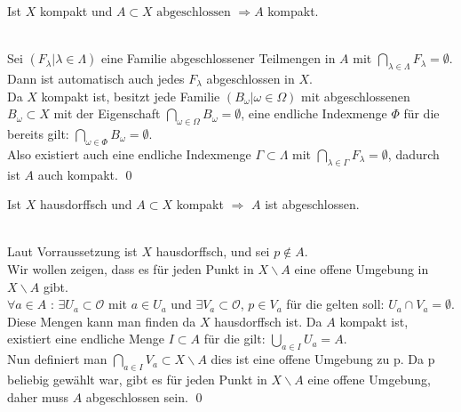 \begin{Satz}
		Ist \(X\) kompakt und \(A \subset X \mbox{ abgeschlossen } \Rightarrow A\) kompakt.
\end{Satz}
%
	\\
 	Sei \((F_{\lambda} | \lambda \in \Lambda) \) eine Familie abgeschlossener Teilmengen in \(A\) mit \( \bigcap_{\lambda \in \Lambda } F_{\lambda} = \emptyset \).\\
	Dann ist automatisch auch jedes \(F_{\lambda} \) abgeschlossen in \(X\).\\
	Da \(X\) kompakt ist, besitzt jede Familie \((B_{\omega} | \omega \in \Omega) \) mit abgeschlossenen 
	\(B_{\omega} \subset X \) mit der Eigenschaft \( \bigcap_{\omega \in \Omega} B_{\omega} = \emptyset\), eine 
	endliche Indexmenge \(\Phi \) für die bereits gilt: \( \bigcap_{\omega \in \Phi} B_{\omega} = \emptyset\).\\
	Also existiert auch eine endliche Indexmenge \( \Gamma \subset \Lambda \) mit \( \bigcap_{\lambda \in \Gamma } F_{\lambda} = \emptyset \), dadurch ist 
	\(A\) auch kompakt.
\qed
		
		
\begin{Satz}
	Ist \(X\) hausdorffsch und \(A \subset X \) kompakt \( \Rightarrow \) \(A\) ist abgeschlossen.
\end{Satz}
%
	\\
	Laut Vorraussetzung ist \(X\) hausdorffsch, und sei \(p \notin A \). \\
	Wir wollen zeigen, dass es für jeden Punkt in \(X \backslash A \) eine offene Umgebung in \(X \backslash A \) gibt.\\
	\( \forall a \in A\) : \(\exists U_{a}\subset \mathcal{O} \) mit \(  a \in U_{a}\) und \(\exists V_{a}\subset \mathcal{O} \), \(  p \in V_{a}\) für die gelten soll:
	 \(U_{a} \cap V_{a} = \emptyset \). Diese Mengen kann man finden da \(X\) hausdorffsch ist. Da \(A\) kompakt ist, existiert eine endliche Menge \(I \subset A\) für die gilt:
	\( \bigcup_{a \in I} U_{a} = A \). \\
	Nun definiert man \(\bigcap_{a \in I} V_{a} \subset X\backslash A \) dies ist eine offene Umgebung zu p. Da p beliebig gewählt war, gibt es 
	für jeden Punkt in \(X\backslash A \) eine offene Umgebung, daher muss \(A\) abgeschlossen sein. 
\qed
		
